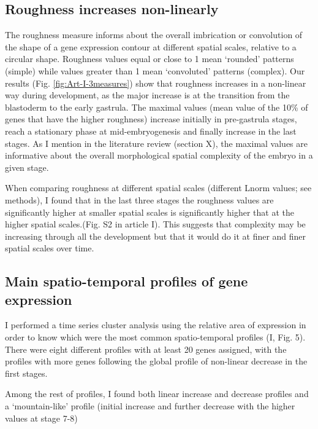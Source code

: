 \subsection{Roughness increases non-linearly}
The roughness measure informs about the overall imbrication or convolution of the shape of a gene expression contour at different spatial scales, relative to a circular shape.
Roughness values equal or close to 1 mean `rounded' patterns (simple) while values greater than 1 mean `convoluted' patterns (complex).
Our results (Fig. \ref{fig:Art-I-3measures}) show that roughness increases in a non-linear way during development, as the major increase is at the transition from the blastoderm to the early gastrula.
The maximal values (mean value of the 10\% of genes that have the higher roughness) increase initially in pre-gastrula stages, reach a stationary phase at mid-embryogenesis and finally increase in the last stages. 
As I mention in the literature review (section X), the maximal values are informative about the overall morphological spatial complexity of the embryo in a given stage.

When comparing roughness at different spatial scales (different Lnorm values; see methods), I found that in the last three stages the roughness values are significantly higher at smaller spatial scales is significantly higher that at the higher spatial scales.(Fig. S2 in article I). 
This suggests that complexity may be increasing through all the development but that it would do it at finer and finer spatial scales over time.


\subsection{Main spatio-temporal profiles of gene expression}
I performed a time series cluster analysis \citep{Ernst2006} using the relative area of expression in order to know which were the most common spatio-temporal profiles (I, Fig. 5).
There were eight different profiles with at least 20 genes assigned, with the profiles with more genes following the global profile of non-linear decrease in the first stages.

Among the rest of profiles, I found both linear increase and decrease profiles and a `mountain-like' profile (initial increase and further decrease with the higher values at stage 7-8)

